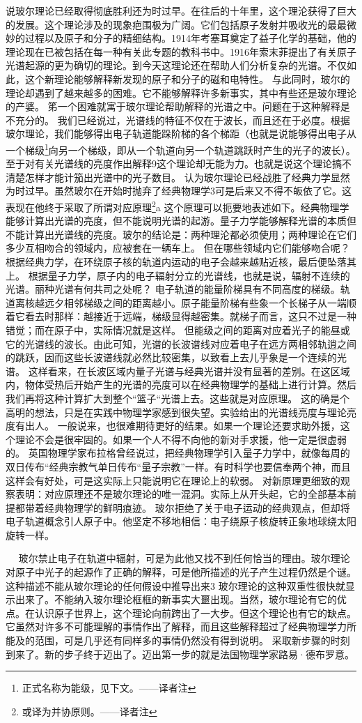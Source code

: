 说玻尔理论已经取得彻底胜利还为时过早。在往后的十年里，这个理沦获得了巨大的发展。这个理论涉及的现象疤围极为广阔。它们包括原子发射并吸收光的最最微妙的过程以及原子和分子的精细结构。1914年考塞耳奠定了益子化学的基础，他的理论现在已被包括在每一种有关此专题的教科书中。1916年索末菲提出了有关原子光谱起源的更为确切的理论。到今天这理论还在帮助人们分析复杂的光谱。不仅如此，这个新理论能够解释新发现的原子和分子的磁和电特性。
与此同时，玻尔的理论却遇到了越来越多的困难。它不能够解释许多新事实，其中有些还是玻尔理论的产婆。
笫一个困难就寓于玻尔理论帮助解释的光谱之中。问题在于这种解释是不充分的。
我们已经说过，光谱线的特征不仅在于波长，而且还在于必度。根据玻尔理论，我们能够得出电子轨道能跺阶梯的各个梯距（也就是说能够得出电子从一个梯级\footnote{正式名称为能级，见下文。——译者注}向另一个梯级，即从一个轨道向另一个轨道跳跃时产生的光子的波长）。至于对有关光谱线的亮度作出解释9这个理论却无能为力。也就是说这个理论搞不清楚怎样才能计笳出光谱中的光子数目。
认为玻尔理论已经战胜了经典力学显然为时过早。虽然玻尔在开始时抛弃了经典物理学3可是后来又不得不皈依了它。这表现在他终于采取了所谓对应原理\footnote{或译为并协原则。——译者注}a
这个原理可以扼要地表述如下。经典物理学能够计算出光谱的亮度，但不能说明光谱的起游。量子力学能够解释光谱的本质但不能计算出光谱线的亮度。玻尔的结论是：两种理沦都必须使用；两种理论在它们多少互相吻合的领域内，应被套在一辆车上。
但在哪些领域内它们能够吻合呢？根据经典力学，在环绕原子核的轨道内运动的电子会越来越贴近核，最后便坠落其上。
根据量子力学，原子内的电子辐射分立的光谱线，也就是说，辐射不连续的光谱。丽种光谱有何共司之处呢？
电子轨道的能量阶梯具有不同高度的梯级。轨道离核越远夕相邻梯级之间的距离越小。原子能量阶梯有些象一个长梯子从一端顺着它看去时那样：越接近于远端，梯级显得越密集。就梯子而言，这只不过是一种错觉；而在原子中，实际情况就是这样。
但能级之间的距离对应着光子的能昼或它的光谱线的波长。由此可知，光谱的长波谱线对应着电子在远方两相邻轨逍之间的跳跃，因而这些长波谱线就必然比较密集，以致看上去儿乎象是一个连续的光谱。
这样看来，在长波区域内量子光谱与经典光谱并没有显著的差别。在这区域内，物体受热后开始产生的光谱的亮度可以在经典物理学的基础上进行计算。然后我们再将这种计算扩大到整个“篮子“光谱上去。这些就是对应原理。
这的确是个高明的想法，只是在实践中物理学家感到很失望。实验给出的光谱线亮度与理论亮度有出人。
一般说来，也很难期待更好的结果。如果一个理论还要求助外援，这个理论不会是很牢固的。如果一个人不得不向他的新对手求援，他一定是很虚弱的。
英国物理学家布拉格曾经说过，把经典物理学引入量子力学中，就像每周的双日传布“经典宗教气单日传布“量子宗教”一样。有时科学也要信奉两个神，而且这样会有好处，可是这实际上只能说明它在理论上的软弱。
对新原理更细致的观察表明：对应原理还不是玻尔理论的唯一混洞。实际上从开头起，它的全部基本前提都带着经典物理学的鲜明痕迹。
玻尔拒绝了关于电子运动的经典观点，但却将电子轨道概念引人原子中。他坚定不移地相信：电子绕原子核旋转正象地球绕太阳旋转一样。

  
玻尔禁止电子在轨道中辐射，可是为此他又找不到任何恰当的理由。玻尔理论对原子中光子的起源作了正确的解释，可是他所描述的光子产生过程仍然是个谜。这种描述不能从玻尔理论的任何假设中推导出来3
玻尔理论的这种双重性很快就显示出来了。不能纳入玻尔理论框框的新事实大噩出现。当然，玻尔理论有它的优点。在认识原子世界上，这个理论向前跨出了一大步。但这个理论也有它的缺点。它虽然对许多不可能理解的事情作出了解释，而且这些解释超过了经典物理学力所能及的范围，可是几乎还有同样多的事情仍然没有得到说明。
采取新步骤的时刻到来了。新的步子终于迈出了。迈出第一步的就是法国物理学家路易·德布罗意。

